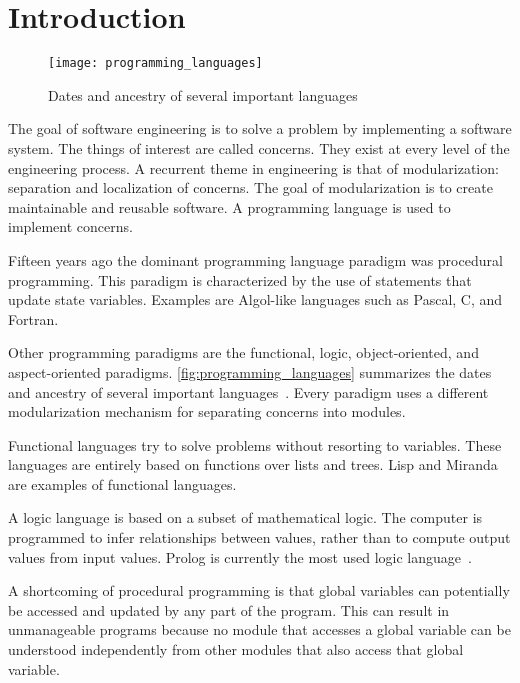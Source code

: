 \section{Introduction}
%
%

\begin{figure}
  \centering
  \texttt{[image: programming\_languages]}
  \caption{Dates and ancestry of several important languages}
  \label{fig:programming_languages}
\end{figure}

The goal of software engineering is to solve a problem by implementing a software system.
The things of interest are called concerns.
They exist at every level of the engineering process.
A recurrent theme in engineering is that of modularization: separation and localization of concerns.
The goal of modularization is to create maintainable and reusable software.
A programming language is used to implement concerns.

Fifteen years ago the dominant programming language paradigm was procedural programming.
This paradigm is characterized by the use of statements that update state variables.
Examples are Algol-like languages such as Pascal, C, and Fortran.

Other programming paradigms are the functional, logic, object-oriented, and aspect-oriented paradigms.
\autoref{fig:programming_languages} summarizes the dates and ancestry of several important languages~\cite{Watt90}.
Every paradigm uses a different modularization mechanism for separating concerns into modules.

Functional languages try to solve problems without resorting to variables.
These languages are entirely based on functions over lists and trees.
Lisp and Miranda are examples of functional languages.

A logic language is based on a subset of mathematical logic.
The computer is programmed to infer relationships between values, rather than to compute output values from input values.
Prolog is currently the most used logic language~\cite{Watt90}.

A shortcoming of procedural programming is that global variables can potentially be accessed and updated by any part of the program.
This can result in unmanageable programs because no module that accesses a global variable can be understood independently from other modules that also access that global variable.

